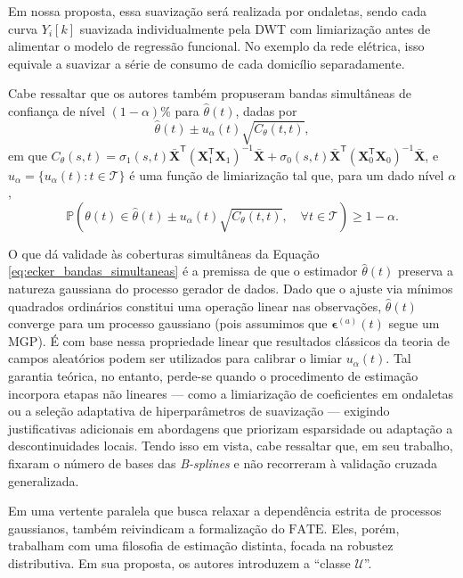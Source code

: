 Em nossa proposta, essa suavização será realizada por ondaletas, sendo cada curva \(Y_i[k]\) suavizada individualmente pela DWT com limiarização antes de alimentar o modelo de regressão funcional. 
No exemplo da rede elétrica, isso equivale a suavizar a série de consumo de cada domicílio separadamente.

Cabe ressaltar que os autores também propuseram bandas simultâneas de confiança de nível \((1 - \alpha)\%\) para \(\hat{\theta}(t)\), dadas por
\begin{equation}
    \hat{\theta}(t) \pm u_{\alpha}(t)\sqrt{C_{\theta}(t, t)},
    \label{eq:ecker_bandas_simultaneas}
\end{equation}
em que \(C_{\theta}(s, t) = \sigma_{1}(s, t)\bar{\mathbf{X}}^{\mathsf{T}}\left(\mathbf{X}_{1}^{\mathsf{T}}\mathbf{X}_{1}\right)^{-1}\bar{\mathbf{X}} + \sigma_{0}(s, t)\bar{\mathbf{X}}^{\mathsf{T}}\left(\mathbf{X}_{0}^{\mathsf{T}}\mathbf{X}_{0}\right)^{-1}\bar{\mathbf{X}}\), e \(u_{\alpha} = \{u_{\alpha}(t): t \in \mathcal{T}\}\) é uma função de limiarização tal que, para um dado nível \(\alpha\),
\[
    \mathbb{P}\left(\theta(t) \in \hat{\theta}(t) \pm u_{\alpha}(t)\sqrt{C_{\theta}(t, t)}, \quad \forall t \in \mathcal{T}\right) \geq 1 - \alpha. 
\]

O que dá validade às coberturas simultâneas da Equação \ref{eq:ecker_bandas_simultaneas} é a premissa de que o estimador \(\hat{\theta}(t)\) preserva a natureza gaussiana do processo gerador de dados. 
Dado que o ajuste via mínimos quadrados ordinários constitui uma operação linear nas observações, \(\hat{\theta}(t)\) converge para um processo gaussiano (pois assumimos que \(\boldsymbol{\epsilon}^{(a)}(t)\) segue um \(\mathrm{MGP}\)). 
É com base nessa propriedade linear que resultados clássicos da teoria de campos aleatórios podem ser utilizados para calibrar o limiar \(u_{\alpha}(t)\). 
Tal garantia teórica, no entanto, perde-se quando o procedimento de estimação incorpora etapas não lineares --- como a limiarização de coeficientes em ondaletas ou a seleção adaptativa de hiperparâmetros de suavização --- exigindo justificativas adicionais em abordagens que priorizam esparsidade ou adaptação a descontinuidades locais.
Tendo isso em vista, cabe ressaltar que, em seu trabalho,  fixaram o número de bases das \textit{B-splines} e não recorreram à validação cruzada generalizada. 

Em uma vertente paralela que busca relaxar a dependência estrita de processos gaussianos,  também reivindicam a formalização do \(\mathrm{FATE}\). 
Eles, porém, trabalham com uma filosofia de estimação distinta, focada na robustez distributiva. 
Em sua proposta, os autores introduzem a ``classe \(\mathcal{U}\)''. 

